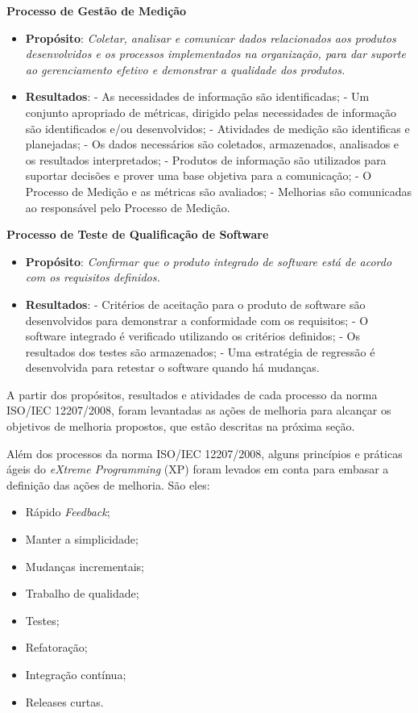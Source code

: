 \noindent
\textbf{Processo de Gestão de Medição}
\begin{itemize}
    \item \textbf{Propósito}: \emph{Coletar, analisar e comunicar dados relacionados aos produtos desenvolvidos e 
	  os processos implementados na organização, para dar suporte ao gerenciamento efetivo e demonstrar a qualidade dos produtos.}
    \item \textbf{Resultados}:
        \subitem - As necessidades de informação são identificadas;
	\subitem - Um conjunto apropriado de métricas, dirigido pelas necessidades de informação são identificados e/ou desenvolvidos;
	\subitem - Atividades de medição são identificas e planejadas;
	\subitem - Os dados necessários são coletados, armazenados, analisados e os resultados interpretados;
	\subitem - Produtos de informação são utilizados para suportar decisões e prover uma base objetiva para a comunicação;
	\subitem - O Processo de Medição e as métricas são avaliados;
	\subitem - Melhorias são comunicadas ao responsável pelo Processo de Medição.
\end{itemize}

\noindent
\textbf{Processo de Teste de Qualificação de Software}
\begin{itemize}
    \item \textbf{Propósito}: \emph{Confirmar que o produto integrado de software está de acordo com os requisitos definidos.}
    \item \textbf{Resultados}:
        \subitem - Critérios de aceitação para o produto de software são desenvolvidos para demonstrar a conformidade com os requisitos;
        \subitem - O software integrado é verificado utilizando os critérios definidos;
        \subitem - Os resultados dos testes são armazenados;
        \subitem - Uma estratégia de regressão é desenvolvida para retestar o software quando há mudanças.
\end{itemize}


A partir dos propósitos, resultados e atividades de cada processo da norma ISO/IEC 12207/2008, foram levantadas as ações de melhoria
para alcançar os objetivos de melhoria propostos, que estão descritas na próxima seção.

Além dos processos da norma ISO/IEC 12207/2008, alguns princípios e práticas ágeis do \textit{eXtreme Programming} (XP) \cite{xp} 
foram levados em conta para embasar a definição das ações de melhoria. São eles:

\begin{itemize}
 \item Rápido \textit{Feedback};
 \item Manter a simplicidade;
 \item Mudanças incrementais;
 \item Trabalho de qualidade;
 \item Testes;
 \item Refatoração;
 \item Integração contínua;
 \item Releases curtas.
\end{itemize}

